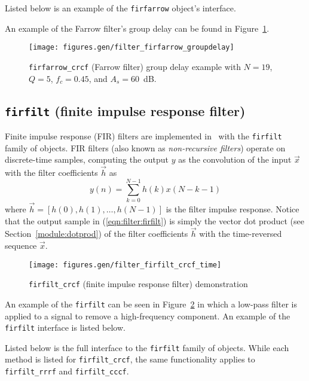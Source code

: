 %
Listed below is an example of the {\tt firfarrow} object's
interface.
%

%
An example of the Farrow filter's group delay can be found in
Figure~\ref{fig:module:filter:firfarrow_groupdelay}.
%
\begin{figure}
\centering
  \texttt{[image: figures.gen/filter\_firfarrow\_groupdelay]}
\caption{{\tt firfarrow\_crcf} (Farrow filter) group delay example
    with $N=19$, $Q=5$, $f_c=0.45$, and $A_s=60$~dB.}
\label{fig:module:filter:firfarrow_groupdelay}
\end{figure}
%



%
%
\subsection{{\tt firfilt} (finite impulse response filter)}
\label{module:filter:firfilt}
Finite impulse response (FIR) filters are implemented in \liquid\ with
the {\tt firfilt} family of objects.
FIR filters (also known as {\em non-recursive filters}) operate on
discrete-time samples, computing the output $y$ as the convolution of
the input $\vec{x}$ with the filter coefficients $\vec{h}$ as
%
\begin{equation}
\label{eqn:filter:firfilt}
    y(n) = \sum_{k=0}^{N-1}{ h(k) x(N-k-1) }
\end{equation}
%
where $\vec{h} = [h(0),h(1),\ldots,h(N-1)]$
is the filter impulse response.
Notice that the output sample in (\ref{eqn:filter:firfilt})
is simply the vector dot product (see Section~\ref{module:dotprod})
of the filter coefficients $\vec{h}$ with the time-reversed sequence
$\vec{x}$.
%
\begin{figure}
\centering
  \texttt{[image: figures.gen/filter\_firfilt\_crcf\_time]}
\caption{{\tt firfilt\_crcf} (finite impulse response filter) demonstration}
\label{fig:module:filter:firfilt_crcf}
\end{figure}
%
An example of the {\tt firfilt} can be seen in
Figure~\ref{fig:module:filter:firfilt_crcf}
in which a low-pass filter is applied to a signal to remove a
high-frequency component.
%
An example of the {\tt firfilt} interface is listed below.
%

%
Listed below is the full interface to the {\tt firfilt} family of
objects.
While each method is listed for {\tt firfilt\_crcf}, the same
functionality applies to {\tt firfilt\_rrrf} and {\tt firfilt\_cccf}.
%
